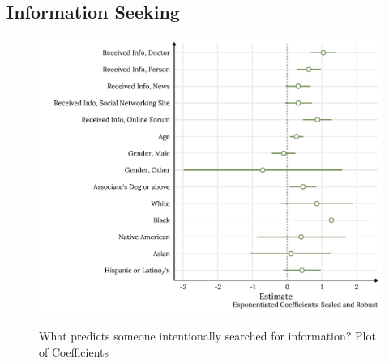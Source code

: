 \hypertarget{information seeking}{%
\subsection{Information Seeking}\label{information seeking}}



\begin{figure}[h]
{\centering \includegraphics[width=0.8\linewidth]{figs/paper2/plot-model-1-1}}
\caption{What predicts someone intentionally searched for information? Plot of Coefficients}\label{fig:plot-model-1}
\end{figure}

